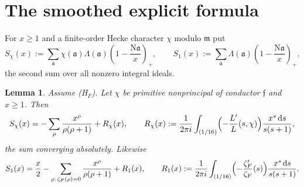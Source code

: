 \documentclass[11pt]{article}
\newtheorem{lemma}{Lemma}[section]
\theoremstyle{definition}
\theoremstyle{remark}
\numberwithin{equation}{section}
\newcommand{\fa}{\mathfrak a}
\newcommand{\fm}{\mathfrak m}
\newcommand{\ff}{\mathfrak f}
\newcommand{\Nm}{\mathrm N}
\newcommand{\dd}{\,\mathrm{d}}
\newcommand{\pos}[1]{\left(#1\right)_+}
\newcommand{\HF}{\textup{(H$_F$)}}
\begin{document}
\section{The smoothed explicit formula}\label{sec:explicit}

For $x\ge1$ and a finite-order Hecke character $\chi$ modulo $\fm$ put
\begin{equation}\label{eq:S}
 S_\chi(x):=\sum_\fa\chi(\fa)\Lambda(\fa)\pos{1-\frac{\Nm\fa}{x}},\qquad S_1(x):=\sum_\fa\Lambda(\fa)\pos{1-\frac{\Nm\fa}{x}},
\end{equation}
the second sum over all nonzero integral ideals.

\begin{lemma}\label{lem:explicit}
Assume \HF. Let $\chi$ be primitive nonprincipal of conductor $\ff$ and $x\ge1$. Then
\begin{equation}\label{eq:explicit}
 S_\chi(x)=-\sum_\rho\frac{x^\rho}{\rho(\rho+1)}+R_\chi(x),\qquad R_\chi(x):=\frac1{2\pi i}\int_{(1/16)}\Bigl(-\frac{L'}{L}(s,\chi)\Bigr)\frac{x^s\dd s}{s(s+1)},
\end{equation}
the sum converging absolutely. Likewise
\begin{equation}\label{eq:explicitF}
 S_1(x)=\frac x2-\sum_{\rho:\,\zeta_F(\rho)=0}\frac{x^\rho}{\rho(\rho+1)}+R_1(x),\qquad R_1(x):=\frac1{2\pi i}\int_{(1/16)}\Bigl(-\frac{\zeta_F'}{\zeta_F}(s)\Bigr)\frac{x^s\dd s}{s(s+1)} .
\end{equation}
\end{lemma}
\end{document}
